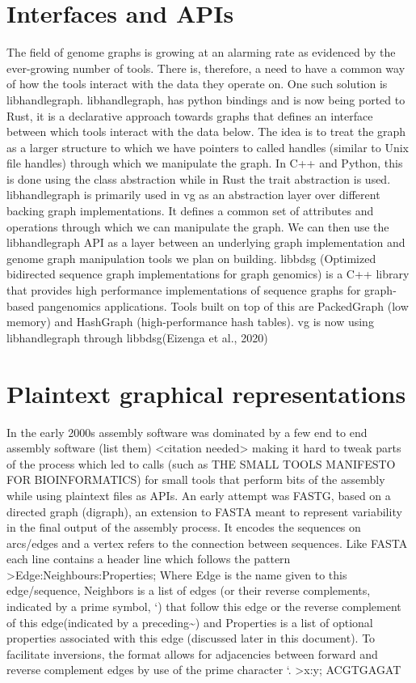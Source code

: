 \documentclass[11pt]{article}
\begin{document}
\section{Interfaces and APIs}
\label{sec:org0be5cfb}
The field of genome graphs is growing at an alarming rate as evidenced by the ever-growing number of tools. There is, therefore, a need to have a common way of how the tools interact with the data they operate on. One such solution is libhandlegraph.
libhandlegraph, has python bindings and is now being ported to Rust, it is a declarative approach towards graphs that defines an interface between which tools interact with the data below. The idea is to treat the graph as a larger structure to which we have pointers to called handles (similar to Unix file handles) through which we manipulate the graph. In C++ and Python, this is done using the class abstraction while in Rust the trait abstraction is used.
libhandlegraph is primarily used in vg as an abstraction layer over different backing graph implementations.
It defines a common set of attributes and operations through which we can manipulate the graph. We can then use the libhandlegraph API as a layer between an underlying graph implementation and genome graph manipulation tools we plan on building.
libbdsg (Optimized bidirected sequence graph implementations for graph genomics) is a C++ library that provides high performance implementations of sequence graphs for graph-based pangenomics applications. Tools built on top of this are PackedGraph (low memory) and HashGraph (high-performance hash tables).
vg is now using libhandlegraph through libbdsg(Eizenga et al., 2020)

\section{Plaintext graphical representations}
\label{sec:org21991be}
In the early 2000s assembly software was dominated by a few end to end assembly software (list them) <citation needed> making it hard to tweak parts of the process which led to calls (such as THE SMALL TOOLS MANIFESTO FOR BIOINFORMATICS) for small tools that perform bits of the assembly while using plaintext files as APIs.
An early attempt was FASTG, based on a directed graph (digraph), an extension to FASTA meant to represent variability in the final output of the assembly process. It encodes the sequences on arcs/edges and a vertex refers to the connection between sequences.
Like FASTA each line contains a header line which follows the pattern >Edge:Neighbours:Properties; Where Edge is the name given to this edge/sequence, Neighbors is a list of edges (or their reverse complements, indicated by a prime symbol, ‘) that follow this edge or the reverse complement of this edge(indicated by a preceding\textasciitilde{}) and Properties is a list of optional properties associated with this edge (discussed later in this document). To facilitate inversions, the format allows for adjacencies between forward and reverse complement edges by use of the prime character ‘.
>x:y;
ACGTGAGAT
\end{document}
